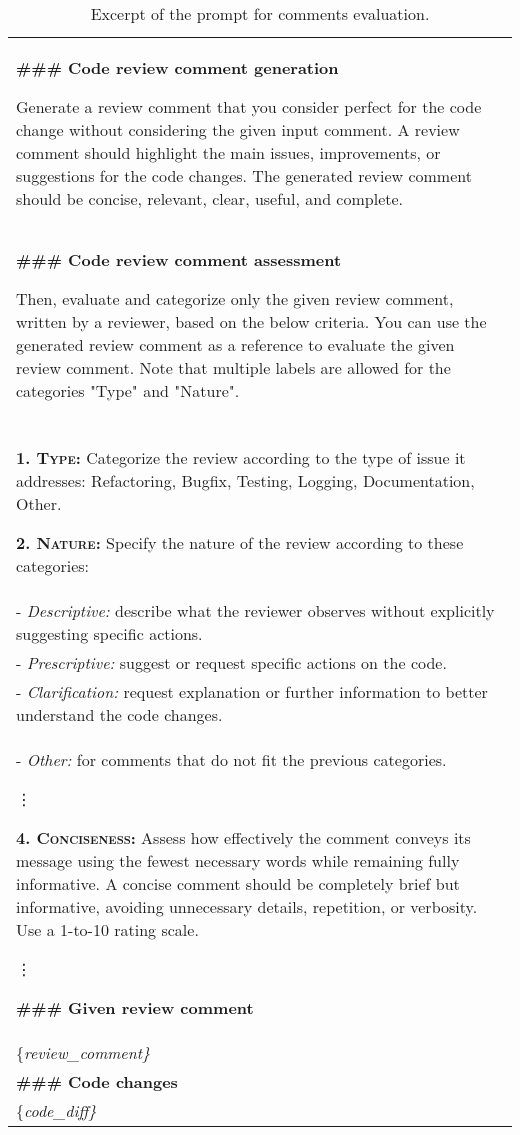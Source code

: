 \begin{table}[!t]
\centering
\caption{Excerpt of the prompt for comments evaluation.}
\vspace{-.5em}
\label{tab:eval_promp}
\begin{tabularx}{\linewidth}{X}
\toprule
\textbf{\#\#\# Code review comment generation}

 Generate a review comment that you consider perfect for the code change without considering the given input comment. A review comment should highlight the main issues, improvements, or suggestions for the code changes. The generated review comment should be concise, relevant, clear, useful, and complete. \\
\vspace{.3em}
\textbf{\#\#\# Code review comment assessment}

Then, evaluate and categorize only the given review comment, written by a reviewer, based on the below criteria.
You can use the generated review comment as a reference to evaluate the given review comment.
Note that multiple labels are allowed for the categories "Type" and "Nature". \\
\\
\textsc{\textbf{1. Type:}} Categorize the review according to the type of issue it addresses: Refactoring, Bugfix, Testing, Logging, Documentation, Other.
\vspace{.3em}

\textsc{\textbf{2. Nature:}} Specify the nature of the review according to these categories:\\
- \textit{Descriptive:} describe what the reviewer observes without explicitly suggesting specific actions.\\
- \textit{Prescriptive:} suggest or request specific actions on the code.\\
- \textit{Clarification:} request explanation or further information to better understand the code changes.\\
- \textit{Other:} for comments that do not fit the previous categories.

\hspace{0.5\linewidth}\vdots

\textsc{\textbf{4. Conciseness:}} Assess how effectively the comment conveys its message using the fewest necessary words while remaining fully informative. A concise comment should be completely brief but informative, avoiding unnecessary details, repetition, or verbosity. Use a 1-to-10 rating scale.

\hspace{0.5\linewidth}\vdots

\textbf{\#\#\# Given review comment}\\
\{\textit{review\_comment\}}\\

\textbf{\#\#\# Code changes}\\
\{\textit{code\_diff\}}\\
\bottomrule
\end{tabularx}
\vspace{-1em}
\end{table}




